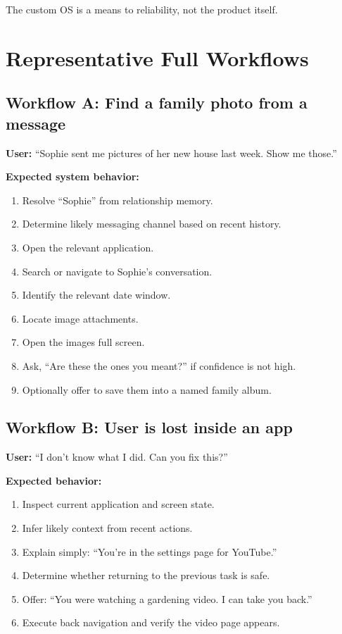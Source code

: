 \documentclass[11pt]{article}
\begin{document}
The custom OS is a means to reliability, not the product itself.

\section{Representative Full Workflows}

\subsection{Workflow A: Find a family photo from a message}
\textbf{User:} ``Sophie sent me pictures of her new house last week. Show me those.''

\textbf{Expected system behavior:}
\begin{enumerate}[leftmargin=*]
    \item Resolve ``Sophie'' from relationship memory.
    \item Determine likely messaging channel based on recent history.
    \item Open the relevant application.
    \item Search or navigate to Sophie's conversation.
    \item Identify the relevant date window.
    \item Locate image attachments.
    \item Open the images full screen.
    \item Ask, ``Are these the ones you meant?'' if confidence is not high.
    \item Optionally offer to save them into a named family album.
\end{enumerate}

\subsection{Workflow B: User is lost inside an app}
\textbf{User:} ``I don't know what I did. Can you fix this?''

\textbf{Expected behavior:}
\begin{enumerate}[leftmargin=*]
    \item Inspect current application and screen state.
    \item Infer likely context from recent actions.
    \item Explain simply: ``You're in the settings page for YouTube.''
    \item Determine whether returning to the previous task is safe.
    \item Offer: ``You were watching a gardening video. I can take you back.''
    \item Execute back navigation and verify the video page appears.
\end{enumerate}
\end{document}
